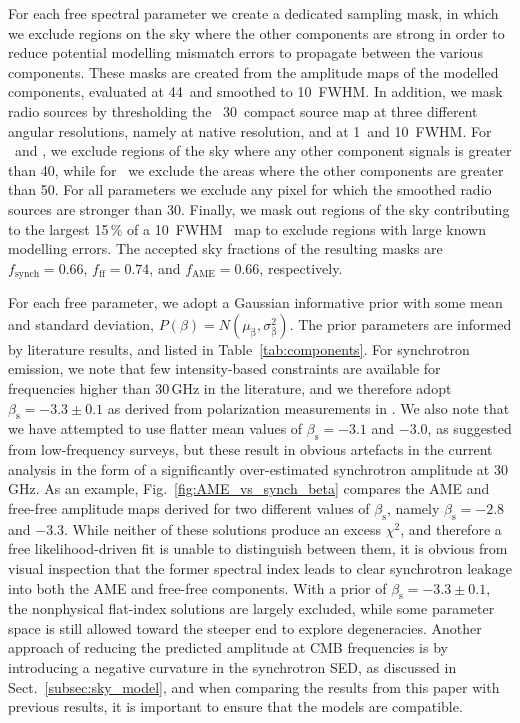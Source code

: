 \documentclass[twocolumn]{aa}
\begin{document}
For each free spectral parameter we create a dedicated sampling mask,
in which we exclude regions on the sky where the other components are
strong in order to reduce potential modelling mismatch errors to
propagate between the various components. These masks are created from
the amplitude maps of the modelled components, evaluated at
44\GHz\ and smoothed to 10\deg\ FWHM. In addition, we mask radio
sources by thresholding the \Planck\ 30\GHz\ compact source map at
three different angular resolutions, namely at native resolution, and
at 1\deg\ and 10\deg\ FWHM. For \bsynch\ and \nup, we exclude regions
of the sky where any other component signals is greater than 40\muKRJ,
while for \Te\ we exclude the areas where the other
components are greater than 50\muKRJ. For all parameters we exclude
any pixel for which the smoothed radio sources are stronger than 30\muKRJ.
Finally, we mask out regions of the sky contributing to the largest 15\,\% of a
10\deg\ FWHM \chisq\ map to exclude regions with large known modelling
errors. The accepted sky fractions of the resulting masks are
$f_{\mathrm{synch}} = 0.66$, $f_{\mathrm{ff}} = 0.74$, and
$f_{\mathrm{AME}} = 0.66$, %
respectively.


For each free parameter, we adopt a Gaussian informative prior with
some mean and standard deviation, $P(\beta) =
N(\mu_{\mathrm{\beta}},\sigma_{\mathrm{\beta}}^2)$.  The prior
parameters are informed by literature results, and listed in
Table~\ref{tab:components}. For synchrotron emission, we note that few
intensity-based constraints are available for frequencies higher than
30\,GHz in the literature, and we therefore adopt
$\beta_{\mathrm{s}}=-3.3\pm0.1$ as derived from polarization
measurements in \citet{planck2016-l05}. We also note that we have
attempted to use flatter mean values of $\beta_{\mathrm{s}}=-3.1$ and
$-3.0$, as suggested from low-frequency surveys, but these result in
obvious artefacts in the current analysis in the form of a
significantly over-estimated synchrotron amplitude at 30\,GHz. As an
example, Fig.~\ref{fig:AME_vs_synch_beta} compares the AME and
free-free amplitude maps derived for two different values of
$\beta_{\mathrm{s}}$, namely $\beta_{\mathrm{s}}=-2.8$ and
$-3.3$. While neither of these solutions produce an excess $\chi^2$,
and therefore a free likelihood-driven fit is unable to distinguish
between them, it is obvious from visual inspection that the former
spectral index leads to clear synchrotron leakage into both the AME
and free-free components. With a prior of
$\beta_{\mathrm{s}}=-3.3\pm0.1$, the nonphysical flat-index solutions
are largely excluded, while some parameter space is still allowed
toward the steeper end to explore degeneracies. Another approach of
reducing the predicted amplitude at CMB frequencies is by introducing
a negative curvature in the synchrotron SED, as discussed in
Sect.~\ref{subsec:sky_model}, and when comparing the results from this paper
with previous results, it is important to ensure that the models are
compatible.
\end{document}
